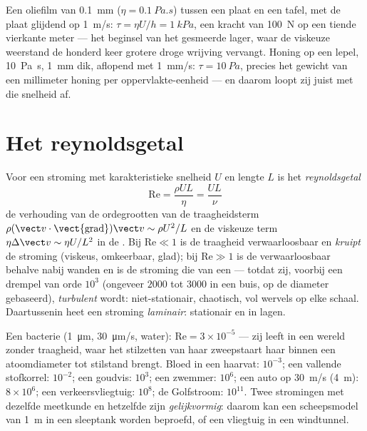 \begin{example}\label{ex:b2:viscous-flows:table}
Een oliefilm van \qty{0.1}{mm} ($\eta = \qty{0.1}{Pa.s}$) tussen een plaat
en een tafel, met de plaat glijdend op \qty{1}{m/s}:
$\tau = \eta U/h = \qty{1}{kPa}$, een kracht van \qty{100}{N} op een tiende
vierkante meter --- het beginsel van het gesmeerde lager, waar de viskeuze
weerstand de honderd keer grotere droge wrijving vervangt. Honing op een
lepel, \qty{10}{Pa.s}, \qty{1}{mm} dik, aflopend met \qty{1}{mm/s}:
$\tau = \qty{10}{Pa}$, precies het gewicht van een millimeter honing per
oppervlakte-eenheid --- en daarom loopt zij juist met die snelheid af.
\end{example}

\section{Het reynoldsgetal}

\begin{definition}[Reynoldsgetal]\label{def:b2:viscous-flows:reynolds}
Voor een stroming met karakteristieke snelheid $U$ en lengte $L$ is het
\emph{reynoldsgetal}
\[
\mathrm{Re} = \frac{\rho UL}{\eta} = \frac{UL}{\nu}
\]
de verhouding van de ordegrootten van de traagheidsterm
$\rho(\vect v\cdot\operatorname{\vect{grad}})\vect v \sim \rho U^2/L$ en de
viskeuze term $\eta\Delta\vect v \sim \eta U/L^2$ in de . Bij $\mathrm{Re} \ll 1$ is de traagheid verwaarloosbaar en
\emph{kruipt} de stroming (viskeus, omkeerbaar, glad); bij
$\mathrm{Re} \gg 1$ is de  verwaarloosbaar behalve nabij wanden
en is de stroming die van een  --- totdat zij, voorbij een
drempel van orde $10^3$ (ongeveer $2000$ tot $3000$ in een buis, op de
diameter gebaseerd), \emph{turbulent} wordt: niet-stationair, chaotisch, vol
wervels op elke schaal. Daartussenin heet een stroming \emph{laminair}:
stationair en in lagen.
\end{definition}

\begin{example}\label{ex:b2:viscous-flows:revalues}
Een bacterie (\qty{1}{\micro m}, \qty{30}{\micro m/s}, water):
$\mathrm{Re} =
3 \times 10^{-5}$ --- zij leeft in een wereld zonder
traagheid, waar het stilzetten van haar zweepstaart haar binnen een
atoomdiameter tot stilstand brengt. Bloed in een haarvat: $10^{-3}$; een
vallende stofkorrel: $10^{-2}$; een goudvis: $10^3$; een zwemmer: $10^6$;
een auto op \qty{30}{m/s} (\qty{4}{m}): $8 \times 10^6$; een
verkeersvliegtuig: $10^8$; de Golfstroom: $10^{11}$. Twee stromingen met
dezelfde meetkunde en hetzelfde  zijn \emph{gelijkvormig}:
daarom kan een scheepsmodel van \qty{1}{m} in een sleeptank worden beproefd,
of een vliegtuig in een windtunnel.
\end{example}


